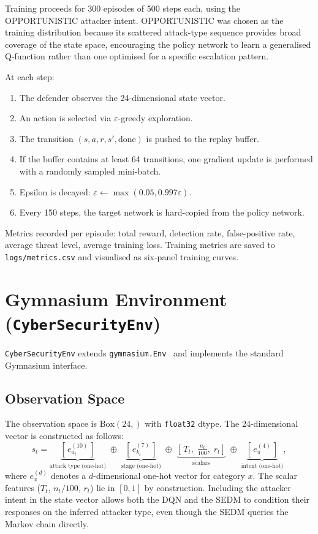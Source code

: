 Training proceeds for 300 episodes of 500 steps each, using the
OPPORTUNISTIC attacker intent.
OPPORTUNISTIC was chosen as the training distribution because its scattered
attack-type sequence provides broad coverage of the state space, encouraging
the policy network to learn a generalised Q-function rather than one
optimised for a specific escalation pattern.

At each step:
%
\begin{enumerate}
  \item The defender observes the 24-dimensional state vector.
  \item An action is selected via $\varepsilon$-greedy exploration.
  \item The transition $(s, a, r, s', \text{done})$ is pushed to the replay buffer.
  \item If the buffer contains at least 64 transitions, one gradient update
        is performed with a randomly sampled mini-batch.
  \item Epsilon is decayed: $\varepsilon \leftarrow \max(0.05, 0.997\varepsilon)$.
  \item Every 150 steps, the target network is hard-copied from the policy network.
\end{enumerate}

Metrics recorded per episode: total reward, detection rate, false-positive
rate, average threat level, average training loss.
Training metrics are saved to \texttt{logs/metrics.csv} and visualised as
six-panel training curves.

\section{Gymnasium Environment (\texttt{CyberSecurityEnv})}
\label{sec:env}

\texttt{CyberSecurityEnv} extends \texttt{gymnasium.Env}~\citep{towers2024gymnasium}
and implements the standard Gymnasium interface.

\subsection{Observation Space}

The observation space is $\text{Box}(24,)$ with \texttt{float32} dtype.
The 24-dimensional vector is constructed as follows:
%
\begin{equation}
  s_t = \underbrace{[\,e_{a_t}^{(10)}\,]}_{\text{attack type (one-hot)}}
       \;\oplus\;
       \underbrace{[\,e_{k_t}^{(7)}\,]}_{\text{stage (one-hot)}}
       \;\oplus\;
       \underbrace{\left[\,T_t,\;\tfrac{n_t}{100},\;r_t\right]}_{\text{scalars}}
       \;\oplus\;
       \underbrace{[\,e_{\pi}^{(4)}\,]}_{\text{intent (one-hot)}},
  \label{eq:state}
\end{equation}
%
where $e_x^{(d)}$ denotes a $d$-dimensional one-hot vector for category $x$.
The scalar features ($T_t$, $n_t/100$, $r_t$) lie in $[0, 1]$ by
construction.
Including the attacker intent in the state vector allows both the DQN and the
SEDM to condition their responses on the inferred attacker type, even though
the SEDM queries the Markov chain directly.

